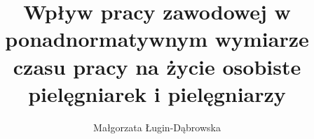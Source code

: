 \documentclass[a4paper,12pt,twoside,openany]{report}
\title{Wpływ pracy zawodowej w ponadnormatywnym wymiarze czasu pracy na życie osobiste pielęgniarek i pielęgniarzy}
\author{Małgorzata Ługin-Dąbrowska}
\begin{document}
\sloppy
\maketitle
\end{document}
